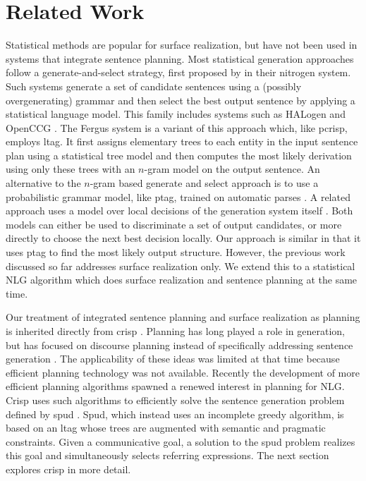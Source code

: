 \section{Related Work}
\label{sec:related}

Statistical methods are popular for surface realization, but have not been used in systems that integrate sentence planning. Most statistical generation approaches follow a generate-and-select strategy, first proposed by  in their {\sc nitrogen} system. Such systems generate a set of candidate sentences using a (possibly overgenerating) grammar and then select the best output sentence by applying a statistical language model. This family includes systems such as {\sc HAL}ogen \cite{langkildeknight1998,langkilde2000} and OpenCCG \cite{whitebaldridge2003}.  The {\sc Fergus} system \cite{bangalorerambow2000} is a variant of this approach which, like {\sc pcrisp}, employs {\sc ltag}. It first assigns elementary trees to each entity in the input sentence plan using a statistical tree model and then computes the most likely derivation using only these trees with an $n$-gram model on the output sentence. An alternative to the $n$-gram based generate and select approach is to use a probabilistic grammar model, like {\sc   ptag}, trained on automatic parses \cite{zhongstent2005}. A related approach uses a model over local decisions of the generation system itself \cite{belz2008}. Both models can either be used to discriminate a set of output candidates, or more directly to choose the next best decision locally. Our approach is similar in that it uses {\sc ptag} to find the most likely output structure. However, the previous work discussed so far addresses surface realization only. We extend this to a statistical NLG algorithm which does surface realization and sentence planning at the same time.

Our treatment of integrated sentence planning and surface realization as planning is inherited directly from {\sc crisp} \cite{kollerstone2007}.  Planning has long played a role in generation, but has focused on discourse planning instead of specifically addressing sentence generation \cite{hovy1988,appelt1992}. The applicability of these ideas was limited at that time because efficient planning technology was not available. Recently the development of more efficient planning algorithms \cite{hoffmannnebel2001} spawned a renewed interest in planning for NLG.  {\sc Crisp} uses such algorithms to efficiently solve the sentence generation problem defined by {\sc spud} \cite{Stone2003a}. {\sc Spud}, which instead uses an incomplete greedy algorithm, is based on an {\sc ltag} whose trees are augmented with semantic and pragmatic constraints. Given a communicative goal, a solution to the {\sc spud} problem realizes this goal and simultaneously selects referring expressions. The next section explores {\sc crisp} in more detail.




